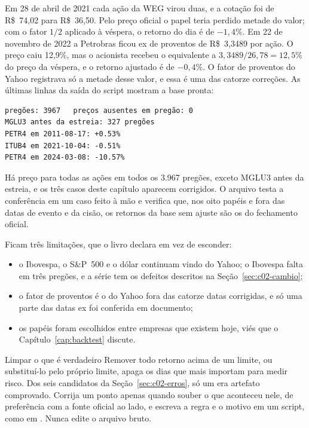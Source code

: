 Em 28 de abril de 2021 cada ação da WEG virou duas, e a cotação foi de R\$~74,02 para R\$~36,50. Pelo preço oficial o papel teria perdido metade do valor; com o fator $1/2$ aplicado à véspera, o retorno do dia é de $-1,4\%$. Em 22 de novembro de 2022 a Petrobras ficou ex de proventos de R\$~3,3489 por ação. O preço caiu 12,9\%, mas o acionista recebeu o equivalente a $3,3489 / 26,78 = 12,5\%$ do preço da véspera, e o retorno ajustado é de $-0,4\%$. O fator de proventos do Yahoo registrava só a metade desse valor, e essa é uma das catorze correções. As últimas linhas da saída do script mostram a base pronta:

\begin{lstlisting}[style=saida]
pregões: 3967   preços ausentes em pregão: 0
MGLU3 antes da estreia: 327 pregões
PETR4 em 2011-08-17: +0.53%
ITUB4 em 2021-10-04: -0.51%
PETR4 em 2024-03-08: -10.57%
\end{lstlisting}

Há preço para todas as ações em todos os 3.967 pregões, exceto MGLU3 antes da estreia, e os três casos deste capítulo aparecem corrigidos. O arquivo  testa a conferência em um caso feito à mão e verifica que, nos oito papéis e fora das datas de evento e da cisão, os retornos da base sem ajuste são os do fechamento oficial.

Ficam três limitações, que o livro declara em vez de esconder:

\begin{itemize}
  \item o Ibovespa, o S\&P~500 e o dólar continuam vindo do Yahoo; o Ibovespa falta em três pregões, e a série  tem os defeitos descritos na Seção~\ref{sec:c02-cambio};
  \item o fator de proventos é o do Yahoo fora das catorze datas corrigidas, e só uma parte das datas ex foi conferida em documento;
  \item os papéis foram escolhidos entre empresas que existem hoje, viés que o Capítulo~\ref{cap:backtest} discute.
\end{itemize}

\begin{armadilha}{Limpar o que é verdadeiro}
Remover todo retorno acima de um limite, ou substituí-lo pelo próprio limite, apaga os dias que mais importam para medir risco. Dos seis candidatos da Seção~\ref{sec:c02-erros}, só um era artefato comprovado. Corrija um ponto apenas quando souber o que aconteceu nele, de preferência com a fonte oficial ao lado, e escreva a regra e o motivo em um script, como em . Nunca edite o arquivo bruto.
\end{armadilha}

